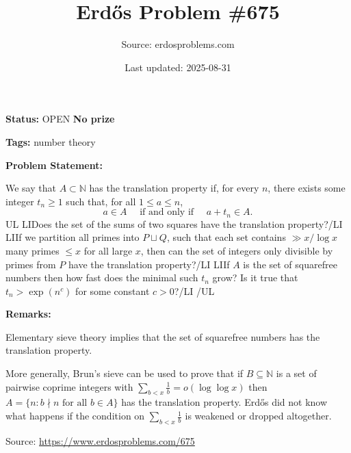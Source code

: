\documentclass{article}
\title{Erd\H{o}s Problem \#675}
\date{Last updated: 2025-08-31}
\author{Source: erdosproblems.com}
\begin{document}
\maketitle

\noindent\textbf{Status:} OPEN \quad \textbf{No prize}

\noindent\textbf{Tags:} number theory

\medskip
\noindent\textbf{Problem Statement:}

We say that $A\subset \mathbb{N}$ has the translation property if, for every $n$, there exists some integer $t_n\geq 1$ such that, for all $1\leq a\leq n$,\[a\in A\quad\textrm{ if and only if }\quad a+t_n\in A.\]{UL}
{LI}Does the set of the sums of two squares have the translation property?{/LI}
{LI}If we partition all primes into $P\sqcup Q$, such that each set contains $\gg x/\log x$ many primes $\leq x$ for all large $x$, then can the set of integers only divisible by primes from $P$ have the translation property?{/LI}
{LI}If $A$ is the set of squarefree numbers then how fast does the minimal such $t_n$ grow? Is it true that $t_n>\exp(n^c)$ for some constant $c>0$?{/LI}
{/UL}

\bigskip
\noindent\textbf{Remarks:}

Elementary sieve theory implies that the set of squarefree numbers has the translation property.

More generally, Brun's sieve can be used to prove that if $B\subseteq \mathbb{N}$ is a set of pairwise coprime integers with $\sum_{b<x}\frac{1}{b}=o(\log\log x)$ then $A=\{ n: b\nmid n\textrm{ for all }b\in A\}$ has the translation property. Erd\H{o}s did not know what happens if the condition on $\sum_{b<x}\frac{1}{b}$ is weakened or dropped altogether.

\bigskip
\noindent\small{Source: \url{https://www.erdosproblems.com/675}}
\end{document}
